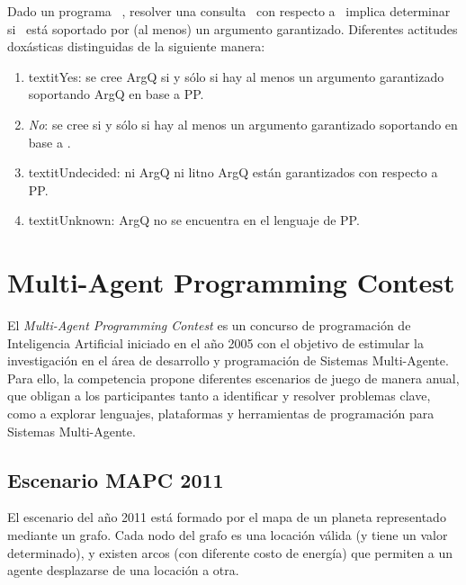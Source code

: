  Dado un programa \DLP\ \PP, resolver una consulta \ArgQ\ con respecto
 a \PP\ implica determinar si \ArgQ\ está soportado por (al menos) un
 argumento garantizado. Diferentes actitudes doxásticas %
 distinguidas de la siguiente manera:
 
 \begin{enumerate}[(1)]
 
 \item textit{Yes}: se cree ArgQ si y sólo si hay al menos un argumento
 garantizado soportando ArgQ en base a PP.
 
 \item \textit{No}: se cree \lit{\no \ArgQ} si y sólo si hay al menos
 un argumento garantizado  soportando \lit{\no \ArgQ} en base a \PP.
 
 \item textit{Undecided}: ni ArgQ ni lit{no ArgQ} están garantizados
 con respecto a PP.
 
 \item textit{Unknown}: ArgQ no se encuentra en el lenguaje de PP.
 
 \end{enumerate}

\section{Multi-Agent Programming Contest}
\label{sec:mapc}

 El \textit{Multi-Agent Programming Contest} es un concurso de
 programación de Inteligencia Artificial iniciado en el año 2005 con el
 objetivo de estimular la investigación en el área de desarrollo y
 programación de Sistemas Multi-Agente.
 Para ello, la competencia propone diferentes escenarios de juego de
 manera anual, que obligan a los participantes tanto a identificar y
 resolver problemas clave, como a explorar lenguajes, plataformas y
 herramientas de programación para Sistemas Multi-Agente.

\subsection{Escenario MAPC 2011}
\label{sub:escenario_mapc}

 El escenario del año 2011 está formado por el mapa de un planeta
 representado mediante un grafo.
 Cada nodo del grafo es una locación válida (y tiene un valor
 determinado), y existen arcos (con diferente costo de energía) que
 permiten a un agente desplazarse de una locación a otra.
 
